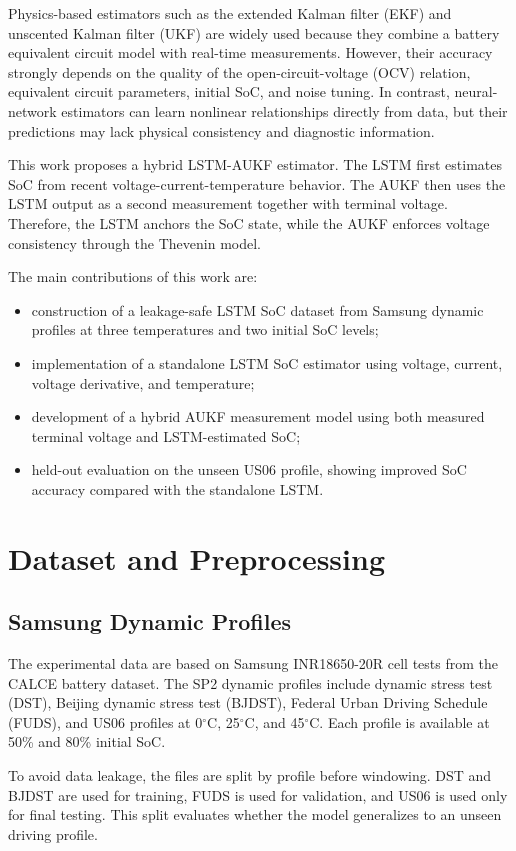 \documentclass[lettersize,journal]{IEEEtran}
\begin{document}
Physics-based estimators such as the extended Kalman filter (EKF) and unscented Kalman filter (UKF) are widely used because they combine a battery equivalent circuit model with real-time measurements. However, their accuracy strongly depends on the quality of the open-circuit-voltage (OCV) relation, equivalent circuit parameters, initial SoC, and noise tuning. In contrast, neural-network estimators can learn nonlinear relationships directly from data, but their predictions may lack physical consistency and diagnostic information.

This work proposes a hybrid LSTM-AUKF estimator. The LSTM first estimates SoC from recent voltage-current-temperature behavior. The AUKF then uses the LSTM output as a second measurement together with terminal voltage. Therefore, the LSTM anchors the SoC state, while the AUKF enforces voltage consistency through the Thevenin model.

The main contributions of this work are:
\begin{itemize}
    \item construction of a leakage-safe LSTM SoC dataset from Samsung dynamic profiles at three temperatures and two initial SoC levels;
    \item implementation of a standalone LSTM SoC estimator using voltage, current, voltage derivative, and temperature;
    \item development of a hybrid AUKF measurement model using both measured terminal voltage and LSTM-estimated SoC;
    \item held-out evaluation on the unseen US06 profile, showing improved SoC accuracy compared with the standalone LSTM.
\end{itemize}

\section{Dataset and Preprocessing}
\subsection{Samsung Dynamic Profiles}
The experimental data are based on Samsung INR18650-20R cell tests from the CALCE battery dataset. The SP2 dynamic profiles include dynamic stress test (DST), Beijing dynamic stress test (BJDST), Federal Urban Driving Schedule (FUDS), and US06 profiles at 0$^\circ$C, 25$^\circ$C, and 45$^\circ$C. Each profile is available at 50\% and 80\% initial SoC.

To avoid data leakage, the files are split by profile before windowing. DST and BJDST are used for training, FUDS is used for validation, and US06 is used only for final testing. This split evaluates whether the model generalizes to an unseen driving profile.
\end{document}
